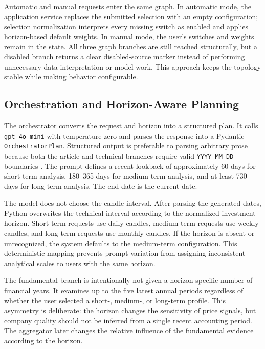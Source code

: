 Automatic and manual requests enter the same graph. In automatic mode, the application service replaces the submitted selection with an empty configuration; selection normalization interprets every missing switch as enabled and applies horizon-based default weights. In manual mode, the user's switches and weights remain in the state. All three graph branches are still reached structurally, but a disabled branch returns a clear disabled-source marker instead of performing unnecessary data interpretation or model work. This approach keeps the topology stable while making behavior configurable.

\subsection{Orchestration and Horizon-Aware Planning}
\label{subsec:analysis-orchestrator-planning}

The orchestrator converts the request and horizon into a structured plan. It calls \texttt{gpt-4o-mini} with temperature zero and parses the response into a Pydantic \texttt{OrchestratorPlan}. Structured output is preferable to parsing arbitrary prose because both the article and technical branches require valid \texttt{YYYY-MM-DD} boundaries \cite{openaiStructuredOutputs2026}. The prompt defines a recent lookback of approximately 60 days for short-term analysis, 180--365 days for medium-term analysis, and at least 730 days for long-term analysis. The end date is the current date.

The model does not choose the candle interval. After parsing the generated dates, Python overwrites the technical interval according to the normalized investment horizon. Short-term requests use daily candles, medium-term requests use weekly candles, and long-term requests use monthly candles. If the horizon is absent or unrecognized, the system defaults to the medium-term configuration. This deterministic mapping prevents prompt variation from assigning inconsistent analytical scales to users with the same horizon.

The fundamental branch is intentionally not given a horizon-specific number of financial years. It examines up to the five latest annual periods regardless of whether the user selected a short-, medium-, or long-term profile. This asymmetry is deliberate: the horizon changes the sensitivity of price signals, but company quality should not be inferred from a single recent accounting period. The aggregator later changes the relative influence of the fundamental evidence according to the horizon.

